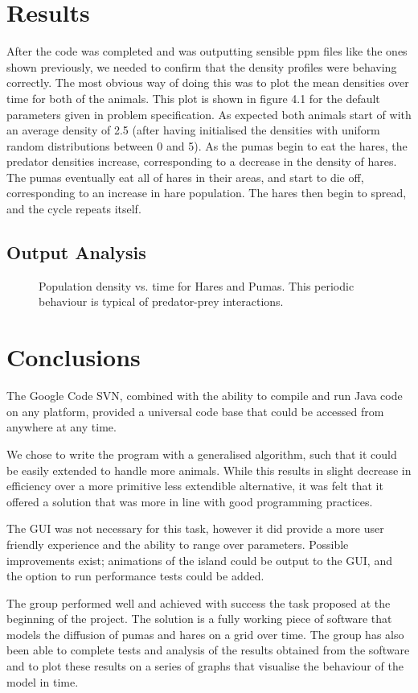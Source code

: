 \documentclass[11pt]{report}
\begin{document}
\chapter{Results}
After the code was completed and was outputting sensible ppm files like the ones shown previously, we needed to confirm that the density profiles were behaving correctly. The most obvious way of doing this was to plot the mean densities over time for both of the animals. This plot is shown in figure 4.1 for the default parameters given in problem specification. As expected both animals start of with an average density of 2.5 (after having initialised the densities with uniform random distributions between 0 and 5). As the pumas begin to eat the hares, the predator densities increase, corresponding to a decrease in the density of hares.
The pumas eventually eat all of hares in their areas, and start to die off, corresponding to an increase in hare population. The hares then begin to spread, and the cycle repeats itself.

	\section{Output Analysis}
	\begin{figure}[H]
   
   
   \caption{Population density vs. time for Hares and Pumas. This periodic behaviour is typical of predator-prey interactions.}
   \end{figure}



\chapter{Conclusions} %

	The Google Code SVN, combined with the ability to compile and run Java code on any platform, provided a universal code base that could be accessed from anywhere at any time.  
	
We chose to write the program with a generalised algorithm, such that it could be easily extended to handle more animals. While this results in slight decrease in efficiency over a more primitive less extendible alternative, it was felt that it offered a solution that was more in line with good programming practices.

The GUI was not necessary for this task, however it did provide a more user friendly experience and the ability to range over parameters. Possible improvements exist; animations of the island could be output to the GUI, and the option to run performance tests could be added.
  
The group performed well and achieved with success the task proposed at the beginning of the project. The solution is a fully working piece of software that models the diffusion of pumas and hares on a grid over time. The group has also been able to complete tests and analysis of the results obtained from the software and to plot these results on a series of graphs that visualise the behaviour of the model in time.
\end{document}
